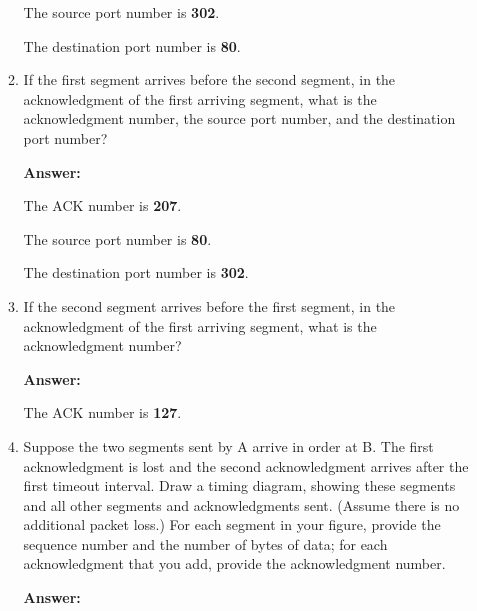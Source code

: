 \begin{enumerate}
\begin{enumerate}
    	The source port number is \textbf{302}. 
    	
    	The destination port number is \textbf{80}.
    	
    	\item If the first segment arrives before the second segment, in the acknowledgment of the first arriving segment, what is the acknowledgment number, the source port number, and the destination port number?
    	
    	\textbf{Answer:}
    	
    	The ACK number is \textbf{207}.
    	
    	The source port number is \textbf{80}.
    	
    	The destination port number is \textbf{302}.
    	
    	\item If the second segment arrives before the first segment, in the acknowledgment of the first arriving segment, what is the acknowledgment
    	number?
    	
    	\textbf{Answer:}
    	
    	The ACK number is \textbf{127}.
    	
    	\item Suppose the two segments sent by A arrive in order at B. The first acknowledgment is lost and the second acknowledgment arrives after the first timeout interval. Draw a timing diagram, showing these segments and all other segments and acknowledgments sent. (Assume there is no additional packet loss.) For each segment in your figure, provide the sequence number and	the number of bytes of data; for each acknowledgment that you add, provide the acknowledgment number.
    	
    	\textbf{Answer:}
    	
        
        
        
        

\end{enumerate}
\end{enumerate}
